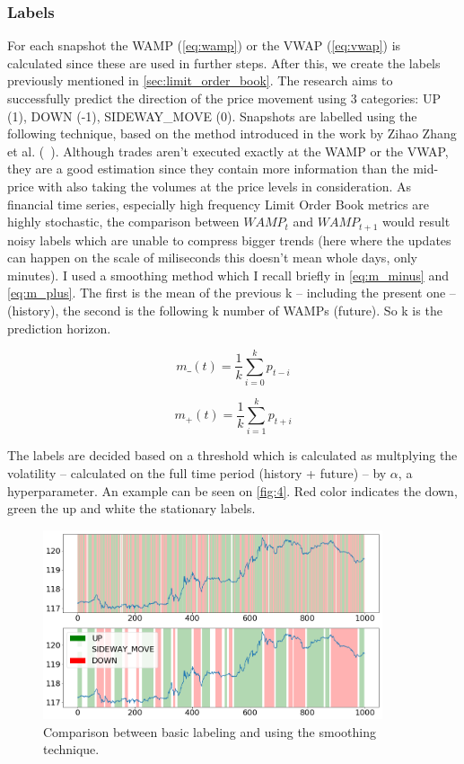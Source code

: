 \documentclass[11pt,a4paper,oneside]{article}
\begin{document}
  \subsubsection{Labels}
  \label{labels}

  For each snapshot the WAMP (\ref{eq:wamp}) or the VWAP (\ref{eq:vwap}) is calculated since these are used in further 
  steps. After this, we create the labels previously mentioned in \ref{sec:limit_order_book}. The research aims to 
  successfully predict the direction of the price movement using 3 categories: UP (1), DOWN (-1), SIDEWAY\_MOVE (0). 
  Snapshots are labelled using the following technique, based on the method introduced in the work by Zihao Zhang et al. 
  (~\cite{deeplob}). Although trades aren't executed exactly at the WAMP or the VWAP, they are a good estimation since 
  they contain more information than the mid-price with also taking the volumes at the price levels in consideration. 
  As financial time series, especially high frequency Limit Order Book metrics are highly stochastic, the comparison 
  between $WAMP_t$ and $WAMP_{t+1}$ would result noisy labels which are unable to compress bigger trends (here where the
  updates can happen on the scale of miliseconds this doesn't mean whole days, only minutes). I used a smoothing method 
  which I recall briefly in \autoref{eq:m_minus} and \autoref{eq:m_plus}. The first is the mean of the previous k –
  including the present one – (history), the second is the following k number of WAMPs (future). So k is the prediction 
  horizon. 

  \begin{equation}
    m\_(t) = \frac{1}{k}\sum_{i=0}^{k}p_{t-i}
    \label{eq:m_minus}
  \end{equation}

  \begin{equation}
    m_+(t) = \frac{1}{k}\sum_{i=1}^{k}p_{t+i}
    \label{eq:m_plus}
  \end{equation}

  The labels are decided based on a threshold which is calculated as multplying the volatility – calculated on the full 
  time period (history + future) – by $\alpha$, a hyperparameter. An example can be seen on \autoref{fig:4}. Red color 
  indicates the down, green the up and white the stationary labels.

  \begin{figure}[tbh]
    \centering
    \includegraphics[width=10cm]{labels.png}
    \caption{Comparison between basic labeling and using the smoothing technique.}
    \label{fig:4}
  \end{figure}
\end{document}
